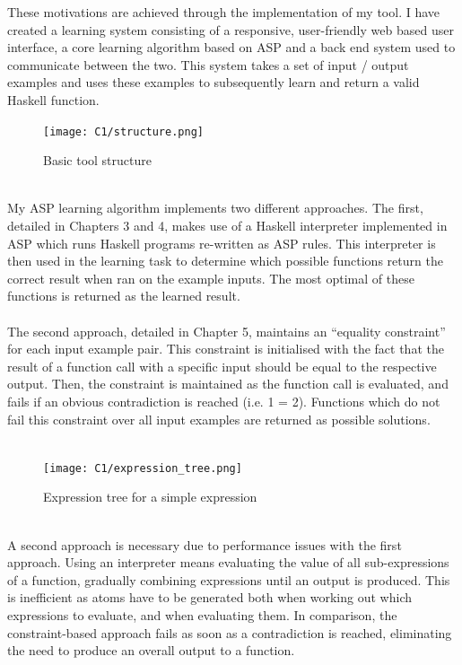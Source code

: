 These motivations are achieved through the implementation of my tool. I have created a learning system consisting of a responsive, user-friendly web based user interface, a core learning algorithm based on ASP and a back end system used to communicate between the two. This system takes a set of input / output examples and uses these examples to subsequently learn and return a valid Haskell function. \\

\begin{figure}[h!]
\centering
\texttt{[image: C1/structure.png]}
\caption{Basic tool structure}
\end{figure}
\mbox{}\\
My ASP learning algorithm implements two different approaches. The first, detailed in Chapters 3 and 4, makes use of a Haskell interpreter implemented in ASP which runs Haskell programs re-written as ASP rules. This interpreter is then used in the learning task to determine which possible functions return the correct result when ran on the example inputs. The most optimal of these functions is returned as the learned result. \\ \\
The second approach, detailed in Chapter 5, maintains an ``equality constraint'' for each input example pair. This constraint is initialised with the fact that the result of a function call with a specific input should be equal to the respective output. Then, the constraint is maintained as the function call is evaluated, and fails if an obvious contradiction is reached (i.e. 1 = 2). Functions which do not fail this constraint over all input examples are returned as possible solutions.\\ \\
\begin{figure}[h!]
\centering
\texttt{[image: C1/expression\_tree.png]}
\caption{Expression tree for a simple expression}
\end{figure}
\mbox{}\\
A second approach is necessary due to performance issues with the first approach. Using an interpreter means evaluating the value of all sub-expressions of a function, gradually combining expressions until an output is produced. This is inefficient as atoms have to be generated both when working out which expressions to evaluate, and when evaluating them. In comparison, the constraint-based approach fails as soon as a contradiction is reached, eliminating the need to produce an overall output to a function. \\ \\
